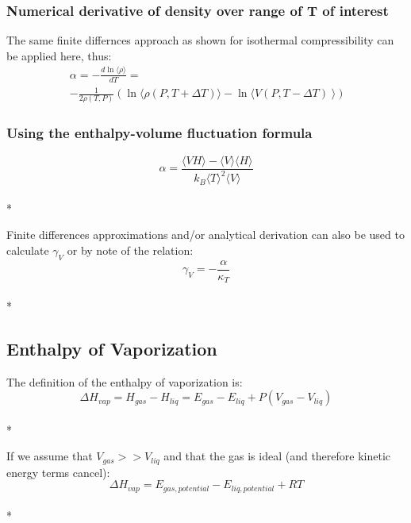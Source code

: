 \documentclass[aps,pre,twocolumn,nofootinbib,superscriptaddress,linenumbers,10pt, draft,tightenlines]{revtex4-1}
\begin{document}
\subsubsection{Numerical derivative of density over range of T of interest}
The same finite differnces approach as shown for isothermal compressibility can be applied here, thus:
\begin{multline}
\alpha = -\frac{d\ln\langle \rho \rangle}{dT} = \\ -\frac{1}{2\rho(T,P)} \left(\ln \langle \rho(P,T+\Delta T)\rangle - \ln \langle V(P,T-\Delta T)\right\rangle)\end{multline}
\subsubsection{Using the enthalpy-volume fluctuation formula}
\begin{equation}\alpha = \frac{\langle VH \rangle - \langle V \rangle \langle H \rangle}{k_B \langle T \rangle^2 \langle V \rangle}\end{equation}\\*

Finite differences approximations and/or analytical derivation can also be used to calculate $\gamma_V$ or by note of the relation:
\begin{equation}\gamma_V = - \frac{\alpha}{\kappa_T}\end{equation}\\*

\subsection{Enthalpy of Vaporization}

The definition of the enthalpy of vaporization is\cite{hvap}:
\begin{equation}\Delta H_{vap} = H_{gas} - H_{liq} = E_{gas} - E_{liq} + P(V_{gas} - V_{liq})\end{equation}\\*

If we assume that $V_{gas} >> V_{liq}$ and that the gas is ideal (and therefore kinetic energy terms cancel):
\begin{equation}\Delta H_{vap} = E_{gas, potential} - E_{liq, potential} + R T\end{equation}\\*
\end{document}
